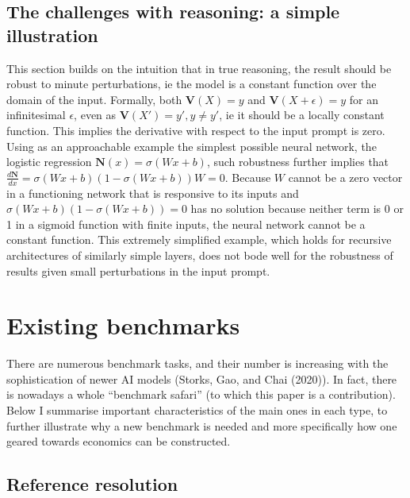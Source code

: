 \documentclass[
]{article}
\begin{document}
\subsection{The challenges with reasoning: a simple
illustration}\label{the-challenges-with-reasoning-a-simple-illustration}

This section builds on the intuition that in true reasoning, the result
should be robust to minute perturbations, ie the model is a constant
function over the domain of the input. Formally, both
\(\mathbf{V}(X) = y\) and \(\mathbf{V}(X + \epsilon) = y\) for an
infinitesimal \(\epsilon\), even as \(\mathbf{V}(X') = y', y \neq y'\),
ie it should be a locally constant function. This implies the derivative
with respect to the input prompt is zero. Using as an approachable
example the simplest possible neural network, the logistic regression
\(\mathbf{N}(x) = \sigma(Wx + b)\), such robustness further implies that
\(\frac{d\mathbf{N}}{d x} = \sigma(Wx + b)(1-\sigma(Wx + b))W = 0\).
Because \(W\) cannot be a zero vector in a functioning network that is
responsive to its inputs and \(\sigma(Wx + b)(1-\sigma(Wx + b)) = 0\)
has no solution because neither term is 0 or 1 in a sigmoid function
with finite inputs, the neural network cannot be a constant function.
This extremely simplified example, which holds for recursive
architectures of similarly simple layers, does not bode well for the
robustness of results given small perturbations in the input prompt.

\section{Existing benchmarks}\label{sec-bench}

There are numerous benchmark tasks, and their number is increasing with
the sophistication of newer AI models (Storks, Gao, and Chai (2020)). In
fact, there is nowadays a whole ``benchmark safari'' (to which this
paper is a contribution). Below I summarise important characteristics of
the main ones in each type, to further illustrate why a new benchmark is
needed and more specifically how one geared towards economics can be
constructed.

\subsection{Reference resolution}\label{reference-resolution}
\end{document}
